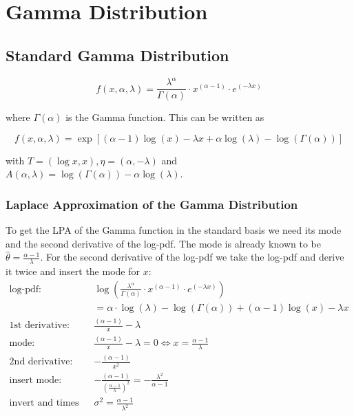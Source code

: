 \section{Gamma Distribution}

\subsection{Standard Gamma Distribution}

\begin{equation}
	f(x, \alpha, \lambda) = \frac{\lambda^\alpha}{\Gamma(\alpha)} \cdot x^{(\alpha - 1)} \cdot e^{(-\lambda x)}
	\label{eq:gamma_pdf}
\end{equation}

where $\Gamma(\alpha)$ is the Gamma function. This can be written as

\begin{equation}
	f(x, \alpha, \lambda) = \exp \left[(\alpha -1)\log(x) - \lambda x + \alpha \log(\lambda) - \log(\Gamma(\alpha))\right]
	\label{eq:gamma_exp_family}
\end{equation}

with $T=(\log x, x), \eta=(\alpha, -\lambda)$ and $A(\alpha, \lambda) = \log(\Gamma(\alpha)) - \alpha  \log(\lambda)$. 

\subsubsection{Laplace Approximation of the Gamma Distribution}

To get the LPA of the Gamma function in the standard basis we need its mode and the second derivative of the log-pdf. The mode is already known to be $\hat{\theta} = \frac{\alpha -1}{\lambda}$. For the second derivative of the log-pdf we take the log-pdf and derive it twice and insert the mode for $x$:
\begin{align*}
	\text{log-pdf: } &\log\left( \frac{\lambda^\alpha}{\Gamma(\alpha)} \cdot x^{(\alpha - 1)} \cdot e^{(-\lambda x)}\right) \\
	&= \alpha \cdot \log(\lambda) - \log(\Gamma(\alpha)) + (\alpha -1)\log(x) -\lambda x\\
	\text{1st derivative: }& \frac{(\alpha-1)}{x} - \lambda \\
	\text{mode: }&  \frac{(\alpha-1)}{x} - \lambda = 0 \Leftrightarrow x=\frac{\alpha -1}{\lambda}\\
	\text{2nd derivative: }& -\frac{(\alpha-1)}{x^2}\\
	\text{insert mode: }& -\frac{(\alpha-1)}{(\frac{\alpha -1}{\lambda})^2} = -\frac{\lambda^2}{\alpha - 1} \\
	\text{invert and times -1: }&\sigma^2 = \frac{\alpha-1}{\lambda^2}
\end{align*}

